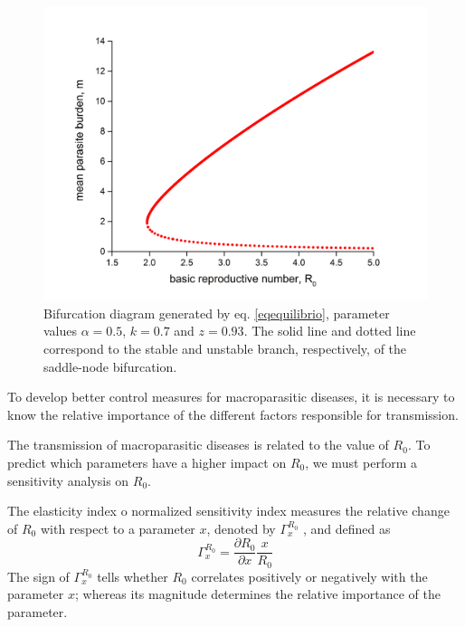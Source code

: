\documentclass[12pt,a4paper]{article}
\theoremstyle{plain}%
\theoremstyle{definition}
\theoremstyle{remark}
\begin{document}
	\begin{figure}[h!]
		\centering
		\includegraphics[width=0.99\linewidth]{bifurcation}
		\caption{Bifurcation diagram generated by eq. \eqref{eqequilibrio}, parameter values $\alpha=0.5$, $k=0.7$ and $z=0.93$.
		The solid line and dotted line correspond to the stable and unstable branch, respectively, of the saddle-node bifurcation.}
		\label{f:phase}
	\end{figure}
	
		To develop better control measures for macroparasitic diseases, it is necessary to know the relative importance of the different factors responsible for transmission.
		
		The transmission of macroparasitic diseases is related to the value of $R_0$. To predict which parameters have a higher impact on $R_0$, we must perform a sensitivity analysis on $R_0$.	
		
		The elasticity index o normalized sensitivity index measures the relative change of $R_0$ with respect to a parameter $x$, denoted by $\Gamma^{R_0}_{x}$ , and defined as
		\begin{equation}
		\Gamma^{R_0}_{x}=\dfrac{\partial R_0}{\partial x} \dfrac{x}{R_0}
		\end{equation}
		The sign of $\Gamma^{R_0}_{x}$ tells whether $R_0$ correlates positively or negatively  with the  parameter $x$; whereas its magnitude determines the relative importance of the parameter.
		
\end{document}

